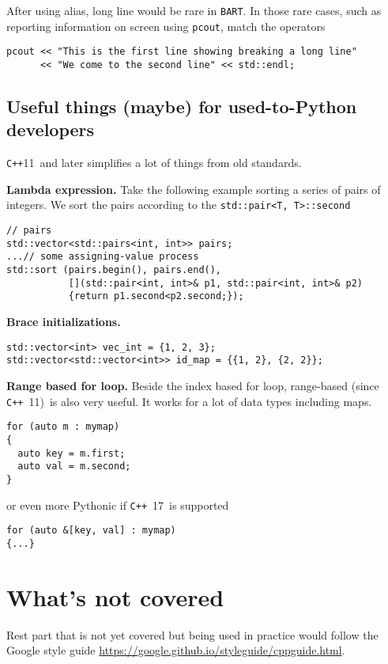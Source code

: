 \documentclass{article}
\newcommand{\bart}{{\tt BART}}
\newcommand{\cpp}{{\tt C++}}
\begin{document}
After using alias, long line would be rare in \bart. In those rare cases, such as reporting information on screen using {\tt pcout}, match the operators
\begin{lstlisting}
pcout << "This is the first line showing breaking a long line"
      << "We come to the second line" << std::endl;
\end{lstlisting}

\subsection{Useful things (maybe) for used-to-Python developers}
\cpp 11\ and later simplifies a lot of things from old standards.

{\bf Lambda expression.} Take the following example sorting a series of pairs of integers. We sort the pairs according to the {\tt std::pair<T, T>::second}
\begin{lstlisting}
// pairs
std::vector<std::pairs<int, int>> pairs;
...// some assigning-value process
std::sort (pairs.begin(), pairs.end(), 
           [](std::pair<int, int>& p1, std::pair<int, int>& p2)
           {return p1.second<p2.second;});
\end{lstlisting}

{\bf Brace initializations.}
\begin{lstlisting}
std::vector<int> vec_int = {1, 2, 3};
std::vector<std::vector<int>> id_map = {{1, 2}, {2, 2}};
\end{lstlisting}

{\bf Range based for loop.} Beside the index based for loop, range-based (since \cpp\ 11)\ is also very useful. It works for a lot of data types including maps.
\begin{lstlisting}
for (auto m : mymap)
{
  auto key = m.first;
  auto val = m.second;
}
\end{lstlisting}
or even more Pythonic if \cpp\ 17\ is supported
\begin{lstlisting}
for (auto &[key, val] : mymap)
{...}
\end{lstlisting}
\section{What's not covered}
Rest part that is not yet covered but being used in practice would follow the Google style guide \url{https://google.github.io/styleguide/cppguide.html}.

\end{document}
